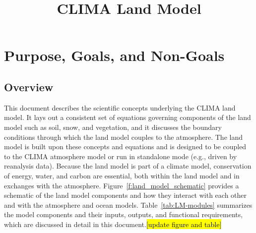 \documentclass{report}
\title{CLIMA Land Model}
\author{ }
\begin{document}
\maketitle
\tableofcontents

\chapter{Purpose, Goals, and Non-Goals}

\section{Overview}

This document describes the scientific concepts underlying the CLIMA land model. It lays out a consistent set of equations governing components of the land model such as soil, snow, and vegetation, and it discusses the boundary conditions through which the land model couples to the atmosphere. The land model is built upon these concepts and equations and is designed to be coupled to the CLIMA atmosphere model or run in standalone mode (e.g., driven by reanalysis data). Because the land model is part of a climate model, conservation of energy, water, and carbon are essential, both within the land model and in exchanges with the atmosphere. Figure~\ref{f:land_model_schematic} provides a schematic of the land model components and how they interact with each other and with the atmosphere and ocean models. Table~\ref{tab:LM-modules} summarizes the model components and their inputs, outputs, and functional requirements, which are discussed in detail in this document.\hl{[update figure and table]}
\end{document}
